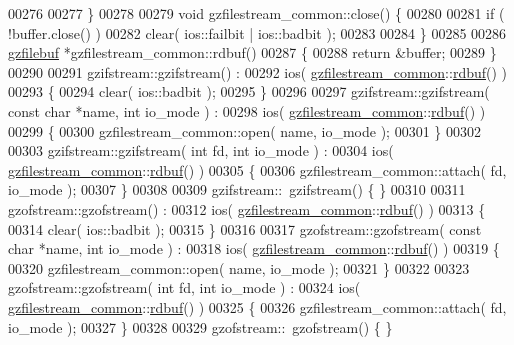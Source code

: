\begin{DoxyCode}
00276 
00277 \}
00278 
00279 \textcolor{keywordtype}{void} gzfilestream\_common::close() \{
00280 
00281   \textcolor{keywordflow}{if} ( !buffer.close() )
00282     clear( ios::failbit | ios::badbit );
00283 
00284 \}
00285 
00286 \hyperlink{classgzfilebuf}{gzfilebuf} *gzfilestream\_common::rdbuf()
00287 \{
00288   \textcolor{keywordflow}{return} &buffer;
00289 \}
00290 
00291 gzifstream::gzifstream() :
00292   ios( \hyperlink{classgzfilestream__common}{gzfilestream\_common}::\hyperlink{classgzofstream_a2fef74202b114357f41cfeb28f1d2acc}{rdbuf}() )
00293 \{
00294   clear( ios::badbit );
00295 \}
00296 
00297 gzifstream::gzifstream( \textcolor{keyword}{const} \textcolor{keywordtype}{char} *name, \textcolor{keywordtype}{int} io\_mode ) :
00298   ios( \hyperlink{classgzfilestream__common}{gzfilestream\_common}::\hyperlink{classgzofstream_a2fef74202b114357f41cfeb28f1d2acc}{rdbuf}() )
00299 \{
00300   gzfilestream\_common::open( name, io\_mode );
00301 \}
00302 
00303 gzifstream::gzifstream( \textcolor{keywordtype}{int} fd, \textcolor{keywordtype}{int} io\_mode ) :
00304   ios( \hyperlink{classgzfilestream__common}{gzfilestream\_common}::\hyperlink{classgzofstream_a2fef74202b114357f41cfeb28f1d2acc}{rdbuf}() )
00305 \{
00306   gzfilestream\_common::attach( fd, io\_mode );
00307 \}
00308 
00309 gzifstream::~gzifstream() \{ \}
00310 
00311 gzofstream::gzofstream() :
00312   ios( \hyperlink{classgzfilestream__common}{gzfilestream\_common}::\hyperlink{classgzofstream_a2fef74202b114357f41cfeb28f1d2acc}{rdbuf}() )
00313 \{
00314   clear( ios::badbit );
00315 \}
00316 
00317 gzofstream::gzofstream( \textcolor{keyword}{const} \textcolor{keywordtype}{char} *name, \textcolor{keywordtype}{int} io\_mode ) :
00318   ios( \hyperlink{classgzfilestream__common}{gzfilestream\_common}::\hyperlink{classgzofstream_a2fef74202b114357f41cfeb28f1d2acc}{rdbuf}() )
00319 \{
00320   gzfilestream\_common::open( name, io\_mode );
00321 \}
00322 
00323 gzofstream::gzofstream( \textcolor{keywordtype}{int} fd, \textcolor{keywordtype}{int} io\_mode ) :
00324   ios( \hyperlink{classgzfilestream__common}{gzfilestream\_common}::\hyperlink{classgzofstream_a2fef74202b114357f41cfeb28f1d2acc}{rdbuf}() )
00325 \{
00326   gzfilestream\_common::attach( fd, io\_mode );
00327 \}
00328 
00329 gzofstream::~gzofstream() \{ \}
\end{DoxyCode}
